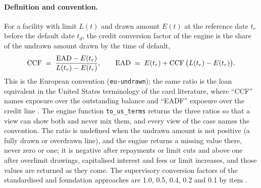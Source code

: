 \paragraph{Definition and convention.} For a facility with limit $L(t)$ and drawn amount $E(t)$ at the reference date $t_r$ before the default date $t_d$, the credit conversion factor of the engine is the share of the undrawn amount drawn by the time of default,
\begin{equation}
\mathrm{CCF}\;=\;\frac{\mathrm{EAD}-E(t_r)}{L(t_r)-E(t_r)},\qquad \mathrm{EAD}\;=\;E(t_r)+\mathrm{CCF}\,\bigl(L(t_r)-E(t_r)\bigr).
\label{eq:lgd-ead-ccf}
\end{equation}
This is the European convention (\texttt{eu-undrawn}); the same ratio is the loan equivalent in the United States terminology of the card literature, where ``CCF'' names exposure over the outstanding balance and ``EADF'' exposure over the credit line \citep{lgd-ead:qi2009}. The engine function \texttt{to\_us\_terms} returns the three ratios so that a view can show both and never mix them, and every view of the case names the convention. The ratio is undefined when the undrawn amount is not positive (a fully drawn or overdrawn line), and the engine returns a missing value there, never zero or one; it is negative after repayments or limit cuts and above one after overlimit drawings, capitalised interest and fees or limit increases, and those values are returned as they come. The supervisory conversion factors of the standardised and foundation approaches are 1.0, 0.5, 0.4, 0.2 and 0.1 by item \citep{lgd-ead:cre20,lgd-ead:cre32}.


